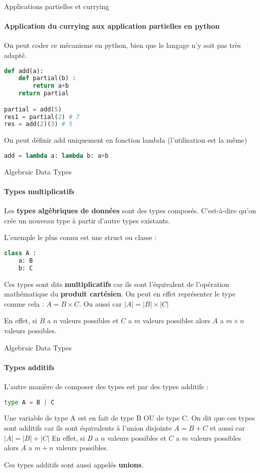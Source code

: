 \documentclass[aspectratio=169]{beamer}
\begin{document}
\begin{frame}[fragile]{Applications partielles et currying}

    \framesubtitle{Application du currying aux application partielles en python}

    On peut coder ce mécanisme en python, bien que le langage n'y soit pas très adapté.

    \begin{lstlisting}[language=Python]
def add(a):
    def partial(b) :
        return a+b
    return partial

partial = add(5)
res1 = partial(2) # 7
res = add(2)(3) # 5
    \end{lstlisting}

On peut définir add uniquement en fonction lambda (l'utilisation est la même)

    \begin{lstlisting}[language=Python]
add = lambda a: lambda b: a+b
    \end{lstlisting}

\end{frame}

\begin{frame}[fragile]{Algebraic Data Types}
    \framesubtitle{Types multiplicatifs}
    Les \textbf{types algébriques de données} sont des types composés. C'est-à-dire qu'on crée un nouveau type à partir d'autre types existants.

    L'exemple le plus connu est une struct ou classe :

    \begin{lstlisting}[language=Python]
class A :
    a: B
    b: C
    \end{lstlisting}

    Ces types sont dits \textbf{multiplicatifs} car ils sont l'équivalent de l'opération mathématique du \textbf{produit cartésien}. On peut en effet représenter le type comme cela : $ A = B \times C$. Ou aussi car $|A| = |B| \times |C|$
    
    En effet, si $B$ a $n$ valeurs possibles et $C$ a $m$ valeurs possibles alors $A$ a $m\times n$ valeurs possibles.
\end{frame}

\begin{frame}[fragile]{Algebraic Data Types}
    \framesubtitle{Types additifs}
    L'autre manière de composer des types est par des types additifs :
    \begin{lstlisting}[language=Python]
type A = B | C
    \end{lstlisting}
    Une variable de type A est en fait de type B OU de type C. On dit que ces types sont additifs car ils sont équivalents à l'union disjointe $A = B+C$ et aussi car $|A|=|B|+|C|$
    En effet, si $B$ a $n$ valeurs possibles et $C$ a $m$ valeurs possibles alors $A$ a $m + n$ valeurs possibles.

    Ces types additifs sont aussi appelés \textbf{unions}.
\end{frame}
\end{document}

